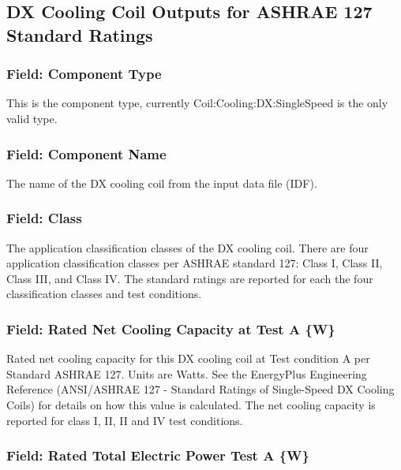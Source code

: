 \subsection{DX Cooling Coil Outputs for ASHRAE 127 Standard Ratings}\label{dx-cooling-coil-outputs-for-ashrae-127-standard-ratings}

\subsubsection{Field: Component Type}\label{field-component-type-6}

This is the component type, currently Coil:Cooling:DX:SingleSpeed is the only valid type.

\subsubsection{Field: Component Name}\label{field-component-name-6}

The name of the DX cooling coil from the input data file (IDF).

\subsubsection{Field: Class}\label{field-class}

The application classification classes of the DX cooling coil. There are four application classification classes per ASHRAE standard 127: Class I, Class II, Class III, and Class IV. The standard ratings are reported for each the four classification classes and test conditions.

\subsubsection{Field: Rated Net Cooling Capacity at Test A \{W\}}\label{field-rated-net-cooling-capacity-at-test-a-w}

Rated net cooling capacity for this DX cooling coil at Test condition A per Standard ASHRAE 127. Units are Watts. See the EnergyPlus Engineering Reference (ANSI/ASHRAE 127 - Standard Ratings of Single-Speed DX Cooling Coils) for details on how this value is calculated. The net cooling capacity is reported for class I, II, II and IV test conditions.

\subsubsection{Field: Rated Total Electric Power Test A \{W\}}\label{field-rated-total-electric-power-test-a-w}

